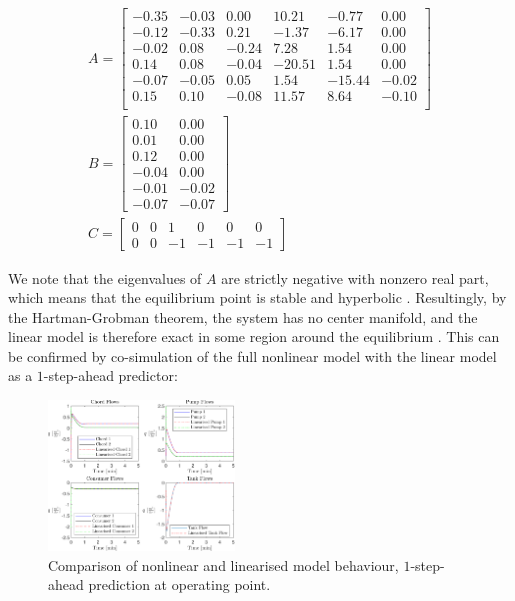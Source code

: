 \begin{equation}\label{eq:LinearisedModelWithTank}
\begin{gathered}
	A = \begin{bmatrix}
		-0.35 & -0.03 & 0.00 & 10.21 & -0.77 & 0.00\\
		-0.12 & -0.33 & 0.21 & -1.37 & -6.17  & 0.00\\
		-0.02 & 0.08 & -0.24 & 7.28 & 1.54 & 0.00\\
		0.14 & 0.08 & -0.04 & -20.51 & 1.54 & 0.00\\
		-0.07 & -0.05 & 0.05 & 1.54 & -15.44 &   -0.02\\
		0.15 & 0.10 & -0.08 & 11.57 & 8.64 & -0.10\\
	\end{bmatrix} \\
	B = \begin{bmatrix}
		0.10 & 0.00\\
		0.01 & 0.00 \\
		0.12 & 0.00 \\
		-0.04 & 0.00 \\
		-0.01 & -0.02\\
		-0.07 & -0.07
	\end{bmatrix}
\\
		C = \begin{bmatrix} 
			0 & 0 & 1 & 0 & 0 & 0	\\		
			0 & 0 & -1 & -1 & -1 & -1
		\end{bmatrix}
\end{gathered}
\end{equation}

We note that the eigenvalues of $A$ are strictly negative with nonzero real part, which means that the equilibrium point is stable and hyperbolic \cite{Khalil}. Resultingly, by the Hartman-Grobman theorem, the system has no center manifold, and the linear model is therefore exact in some region around the equilibrium \cite{Perko2001}. This can be confirmed by co-simulation of the full nonlinear model with the linear model as a $1$-step-ahead predictor:


\begin{figure}[h]
	\centering
	\includegraphics[height = 4cm,width=\linewidth]{Graphics/NominalFlows.pdf}
	\caption{Comparison of nonlinear and linearised model behaviour, $1$-step-ahead prediction at operating point.}
	\label{fig:CompNonLinEQ}
\end{figure}

